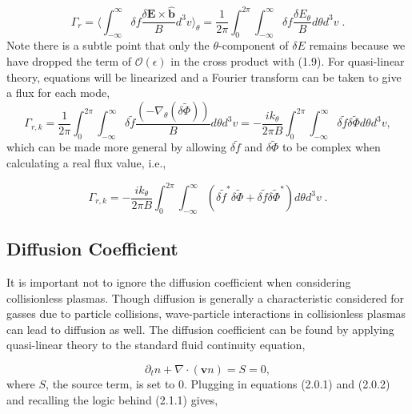 \documentclass[12pt]{article}
\numberwithin{equation}{subsection}
\begin{document}
   \begin{equation}
      \Gamma_r = \langle\int_{-\infty}^{\infty}\delta f \frac{\delta\bm{E}\times\bm{\hat{b}}}{B} d^{3}v\rangle_\theta
               = \frac{1}{2\pi}\int_{0}^{2\pi} \int_{-\infty}^{\infty}\delta f \frac{\delta E_\theta}{B}d\theta d^{3}v \;.
   \end{equation}
Note there is a subtle point that only the $\theta$-component of $\delta E$ remains because we have dropped the term of
$\mathcal{O}(\epsilon)$ in the cross product with (1.9). For quasi-linear theory, equations will be linearized
and a Fourier transform can be taken to give a flux for each mode,
   \begin{equation}
      \Gamma_{r,k} = \frac{1}{2\pi}\int_{0}^{2\pi} \int_{-\infty}^{\infty}\delta\widetilde{f}
                     \frac{(-\nabla_\theta(\delta\widetilde{\Phi}))}{B}d\theta d^{3}v
                   = -\frac{ik_\theta}{2\pi B}\int_{0}^{2\pi}\int_{-\infty}^{\infty}\delta\widetilde{f}
                     \delta\widetilde{\Phi}d\theta d^{3}v,
   \end{equation}
which can be made more general by allowing $\delta\widetilde{f}$ and $\delta\widetilde{\Phi}$ to be complex when calculating a real flux
value, i.e.,
   
   \begin{equation}
      \Gamma_{r,k} = -\frac{ik_\theta}{2\pi B}\int_{0}^{2\pi}\int_{-\infty}^{\infty} (\delta\widetilde{f}^*\delta\widetilde{\Phi}
                     + \delta\widetilde{f}\delta\widetilde{\Phi}^*)d\theta d^{3}v\;.
   \end{equation}

\subsection{Diffusion Coefficient}
   \quad It is important not to ignore the diffusion coefficient when considering collisionless plasmas. Though diffusion is generally a characteristic
considered for gasses due to particle collisions, wave-particle interactions in collisionless plasmas can lead to diffusion as well. The diffusion coefficient
can be found by applying quasi-linear theory to the standard fluid continuity equation,

   \begin{equation}
      \partial_t n + \nabla\cdot(\bm{v}n) = S = 0,
   \end{equation}
where $S$, the source term, is set to 0. Plugging in equations (2.0.1) and (2.0.2) and recalling the logic behind (2.1.1) gives,
\end{document}
